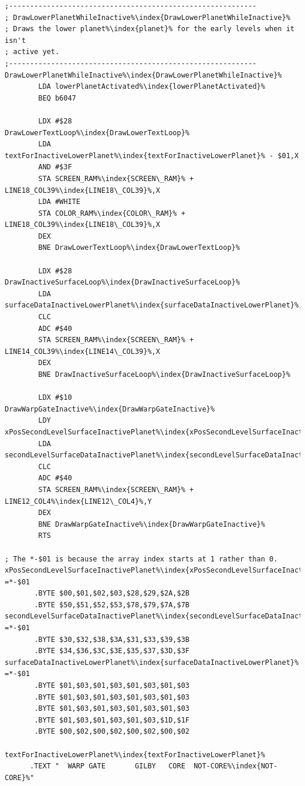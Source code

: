 \begin{lstlisting}[caption=Draw the inactive lower planet\index{planet}.,escapechar=\%]
;-----------------------------------------------------------
; DrawLowerPlanetWhileInactive%\index{DrawLowerPlanetWhileInactive}%
; Draws the lower planet%\index{planet}% for the early levels when it isn't
; active yet.
;-----------------------------------------------------------
DrawLowerPlanetWhileInactive%\index{DrawLowerPlanetWhileInactive}%
        LDA lowerPlanetActivated%\index{lowerPlanetActivated}%
        BEQ b6047

        LDX #$28
DrawLowerTextLoop%\index{DrawLowerTextLoop}%   
        LDA textForInactiveLowerPlanet%\index{textForInactiveLowerPlanet}% - $01,X
        AND #$3F
        STA SCREEN_RAM%\index{SCREEN\_RAM}% + LINE18_COL39%\index{LINE18\_COL39}%,X
        LDA #WHITE
        STA COLOR_RAM%\index{COLOR\_RAM}% + LINE18_COL39%\index{LINE18\_COL39}%,X
        DEX
        BNE DrawLowerTextLoop%\index{DrawLowerTextLoop}%

        LDX #$28
DrawInactiveSurfaceLoop%\index{DrawInactiveSurfaceLoop}%   
        LDA surfaceDataInactiveLowerPlanet%\index{surfaceDataInactiveLowerPlanet}%,X
        CLC
        ADC #$40
        STA SCREEN_RAM%\index{SCREEN\_RAM}% + LINE14_COL39%\index{LINE14\_COL39}%,X
        DEX
        BNE DrawInactiveSurfaceLoop%\index{DrawInactiveSurfaceLoop}%

        LDX #$10
DrawWarpGateInactive%\index{DrawWarpGateInactive}%   
        LDY xPosSecondLevelSurfaceInactivePlanet%\index{xPosSecondLevelSurfaceInactivePlanet}%,X
        LDA secondLevelSurfaceDataInactivePlanet%\index{secondLevelSurfaceDataInactivePlanet}%,X
        CLC
        ADC #$40
        STA SCREEN_RAM%\index{SCREEN\_RAM}% + LINE12_COL4%\index{LINE12\_COL4}%,Y
        DEX
        BNE DrawWarpGateInactive%\index{DrawWarpGateInactive}%
        RTS

; The *-$01 is because the array index starts at 1 rather than 0.
xPosSecondLevelSurfaceInactivePlanet%\index{xPosSecondLevelSurfaceInactivePlanet}% =*-$01
       .BYTE $00,$01,$02,$03,$28,$29,$2A,$2B
       .BYTE $50,$51,$52,$53,$78,$79,$7A,$7B
secondLevelSurfaceDataInactivePlanet%\index{secondLevelSurfaceDataInactivePlanet}% =*-$01 
       .BYTE $30,$32,$38,$3A,$31,$33,$39,$3B
       .BYTE $34,$36,$3C,$3E,$35,$37,$3D,$3F
surfaceDataInactiveLowerPlanet%\index{surfaceDataInactiveLowerPlanet}% =*-$01       
       .BYTE $01,$03,$01,$03,$01,$03,$01,$03
       .BYTE $01,$03,$01,$03,$01,$03,$01,$03
       .BYTE $01,$03,$01,$03,$01,$03,$01,$03
       .BYTE $01,$03,$01,$03,$01,$03,$1D,$1F
       .BYTE $00,$02,$00,$02,$00,$02,$00,$02

textForInactiveLowerPlanet%\index{textForInactiveLowerPlanet}%
      .TEXT "  WARP GATE       GILBY   CORE  NOT-CORE%\index{NOT-CORE}%"
\end{lstlisting}


